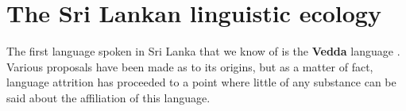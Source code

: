 \documentclass{article}
\begin{document}
\section{The Sri Lankan linguistic ecology} \label{sec:ecology}
The first language spoken in Sri Lanka that we know of is the \textbf{Vedda} language \citep[505]{Geiger1973}. Various proposals have been made as to its origins, but as a matter of fact, language attrition has proceeded to a point where little of any substance can be said about the affiliation of this language. 
\end{document}
